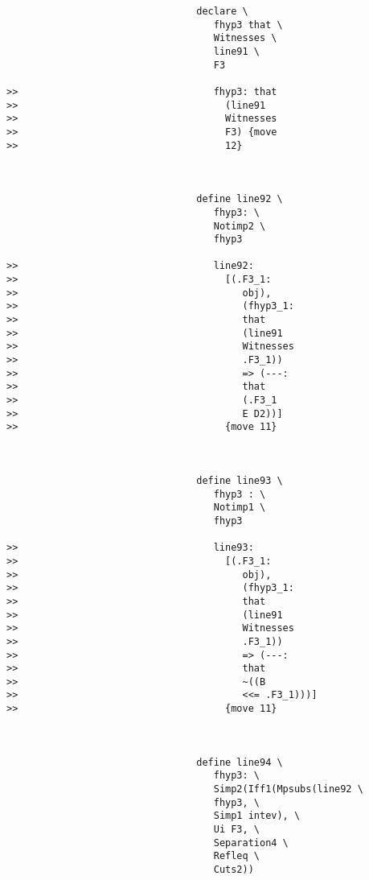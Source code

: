 \documentclass[12pt]{article}
\begin{document}
\begin{verbatim}
                                 declare \
                                    fhyp3 that \
                                    Witnesses \
                                    line91 \
                                    F3

>>                                  fhyp3: that
>>                                    (line91
>>                                    Witnesses
>>                                    F3) {move
>>                                    12}



                                 define line92 \
                                    fhyp3: \
                                    Notimp2 \
                                    fhyp3

>>                                  line92:
>>                                    [(.F3_1:
>>                                       obj),
>>                                       (fhyp3_1:
>>                                       that
>>                                       (line91
>>                                       Witnesses
>>                                       .F3_1))
>>                                       => (---:
>>                                       that
>>                                       (.F3_1
>>                                       E D2))]
>>                                    {move 11}



                                 define line93 \
                                    fhyp3 : \
                                    Notimp1 \
                                    fhyp3

>>                                  line93:
>>                                    [(.F3_1:
>>                                       obj),
>>                                       (fhyp3_1:
>>                                       that
>>                                       (line91
>>                                       Witnesses
>>                                       .F3_1))
>>                                       => (---:
>>                                       that
>>                                       ~((B
>>                                       <<= .F3_1)))]
>>                                    {move 11}



                                 define line94 \
                                    fhyp3: \
                                    Simp2(Iff1(Mpsubs(line92 \
                                    fhyp3, \
                                    Simp1 intev), \
                                    Ui F3, \
                                    Separation4 \
                                    Refleq \
                                    Cuts2))



\end{verbatim}
\end{document}
